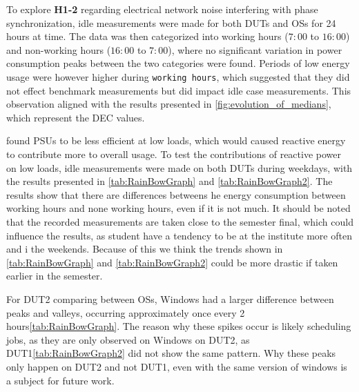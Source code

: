 
To explore \textbf{H1-2} regarding electrical network noise interfering with phase synchronization, idle measurements were made for both DUTs and OSs for 24 hours at time. The data was then categorized into working hours ($7:00$ to $16:00$) and non-working hours ($16:00$ to $7:00$), where no significant variation in power consumption peaks between the two categories were found. Periods of low energy usage were however higher during \texttt{working hours}, which suggested that they did not effect benchmark measurements but did impact idle case measurements. This observation aligned with the results presented in \cref{fig:evolution_of_medians}, which represent the DEC values.

\cite{PowerSupply} found PSUs to be less efficient at low loads, which would caused reactive energy to contribute more to overall usage. To test the contributions of reactive power on low loads, idle measurements were made on both DUTs during weekdays, with the results presented in  \cref{tab:RainBowGraph} and \cref{tab:RainBowGraph2}. The results show that there are differences betweens he energy consumption between working hours and none working hours, even if it is not much. It should be noted that the recorded measurements are taken close to the semester final, which could influence the results, as student have a tendency to be at the institute more often and i the weekends. Because of this we think the trends shown in \cref{tab:RainBowGraph} and \cref{tab:RainBowGraph2} could be more drastic if taken earlier in the semester.

For DUT2 comparing between OSs, Windows had a larger difference between peaks and valleys, occurring approximately once every 2 hours\cref{tab:RainBowGraph}. The reason why these spikes occur is likely scheduling jobs, as they are only observed on Windows on DUT2, as DUT1\cref{tab:RainBowGraph2} did not show the same pattern. Why these peaks only happen on DUT2 and not DUT1, even with the same version of windows is a subject for future work. 

